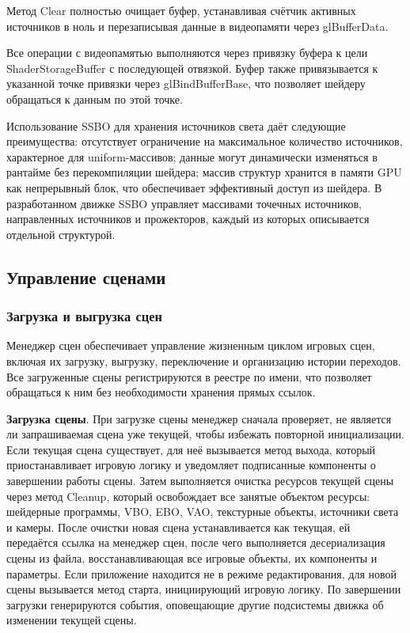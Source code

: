 Метод Clear полностью очищает буфер, устанавливая счётчик активных источников в ноль и перезаписывая данные в видеопамяти через glBufferData.

Все операции с видеопамятью выполняются через привязку буфера к цели ShaderStorageBuffer с последующей отвязкой. Буфер также привязывается к указанной точке привязки через glBindBufferBase, что позволяет шейдеру обращаться к данным по этой точке.

Использование SSBO для хранения источников света даёт следующие преимущества: отсутствует ограничение на максимальное количество источников, характерное для uniform-массивов; данные могут динамически изменяться в рантайме без перекомпиляции шейдера; массив структур хранится в памяти GPU как непрерывный блок, что обеспечивает эффективный доступ из шейдера. В разработанном движке SSBO управляет массивами точечных источников, направленных источников и прожекторов, каждый из которых описывается отдельной структурой.

\subsection{Управление сценами}
\subsubsection{Загрузка и выгрузка сцен}
Менеджер сцен обеспечивает управление жизненным циклом игровых сцен, включая их загрузку, выгрузку, переключение и организацию истории переходов. Все загруженные сцены регистрируются в реестре по имени, что позволяет обращаться к ним без необходимости хранения прямых ссылок.

\textbf{Загрузка сцены}. При загрузке сцены менеджер сначала проверяет, не является ли запрашиваемая сцена уже текущей, чтобы избежать повторной инициализации. Если текущая сцена существует, для неё вызывается метод выхода, который приостанавливает игровую логику и уведомляет подписанные компоненты о завершении работы сцены. Затем выполняется очистка ресурсов текущей сцены через метод Cleanup, который освобождает все занятые объектом ресурсы: шейдерные программы, VBO, EBO, VAO, текстурные объекты, источники света и камеры. После очистки новая сцена устанавливается как текущая, ей передаётся ссылка на менеджер сцен, после чего выполняется десериализация сцены из файла, восстанавливающая все игровые объекты, их компоненты и параметры. Если приложение находится не в режиме редактирования, для новой сцены вызывается метод старта, инициирующий игровую логику. По завершении загрузки генерируются события, оповещающие другие подсистемы движка об изменении текущей сцены.

